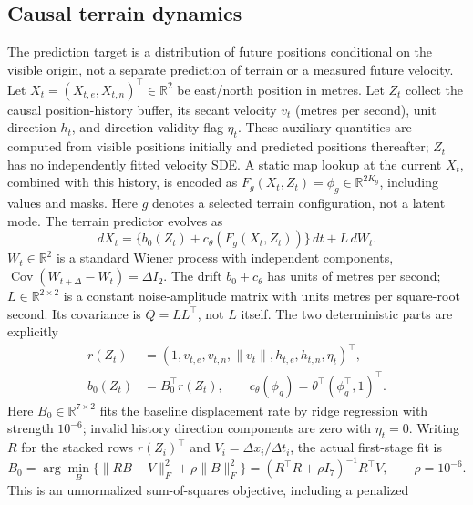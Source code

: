 \documentclass[11pt]{article}
\newcommand{\R}{\mathbb{R}}
\begin{document}
\subsection{Causal terrain dynamics}
The prediction target is a distribution of future positions conditional on
the visible origin, not a separate prediction of terrain or a measured
future velocity. Let \(X_t=(X_{t,e},X_{t,n})^\top\in\R^2\) be east/north
position in metres. Let \(Z_t\) collect the causal position-history buffer,
its secant velocity \(v_t\) (metres per second), unit direction \(h_t\),
and direction-validity flag \(\eta_t\). These auxiliary quantities are
computed from visible positions initially and predicted positions thereafter;
\(Z_t\) has no independently fitted velocity SDE. A static map lookup at
the current \(X_t\), combined with this history, is encoded as
\(F_g(X_t,Z_t)=\phi_g\in\R^{2K_g}\), including values and masks.
Here \(g\) denotes a selected terrain configuration, not a latent mode.
The terrain predictor evolves as
\begin{equation}
 dX_t=\{b_0(Z_t)+c_\theta(F_g(X_t,Z_t))\}\,dt+L\,dW_t .
 \label{eq:terrain-sde}
\end{equation}
\(W_t\in\R^2\) is a standard Wiener process with independent components,
\(\operatorname{Cov}(W_{t+\Delta}-W_t)=\Delta I_2\).
The drift \(b_0+c_\theta\) has units of metres per second;
\(L\in\R^{2\times2}\) is a constant noise-amplitude matrix with units
metres per square-root second. Its covariance is \(Q=LL^\top\), not \(L\)
itself. The two deterministic parts are explicitly
\begin{equation}
 \begin{aligned}
 r(Z_t)&=(1,v_{t,e},v_{t,n},\|v_t\|,h_{t,e},h_{t,n},\eta_t)^\top,\\
 b_0(Z_t)&=B_0^\top r(Z_t),\qquad
 c_\theta(\phi_g)=\theta^\top(\phi_g^\top,1)^\top .
 \end{aligned}
 \label{eq:drift-components}
\end{equation}
Here \(B_0\in\R^{7\times2}\) fits the baseline displacement rate by
ridge regression with strength \(10^{-6}\); invalid history direction
components are zero with \(\eta_t=0\).
Writing \(R\) for the stacked rows \(r(Z_i)^\top\) and \(V_i=\Delta x_i/\Delta t_i\),
the actual first-stage fit is
\begin{equation}
 B_0=\arg\min_B\{\|RB-V\|_F^2+\rho\|B\|_F^2\}
     =(R^\top R+\rho I_7)^{-1}R^\top V,\qquad\rho=10^{-6}.
 \label{eq:baseline-fit}
\end{equation}
This is an unnormalized sum-of-squares objective, including a penalized
\end{document}
